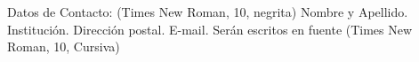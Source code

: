 \begin{contact}
Datos de Contacto: (Times New Roman, 10, negrita) 
Nombre y Apellido. Institución. Dirección postal. E-mail. Serán escritos en fuente (Times New Roman, 10, Cursiva)
\end{contact}

